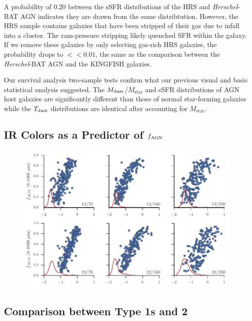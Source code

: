 \documentclass[fleqn, usenatbib]{mnras}
\newcommand{\herschel}{\emph{Herschel}}
\newcommand{\mstar}{$M_{\mathrm{star}}$}
\newcommand{\mdust}{$M_{\rm dust}$}
\newcommand{\tdust}{$T_{\rm dust}$}
\begin{document}
A probability of 0.20 between the sSFR distributions of the HRS and \herschel-BAT AGN indicates they are drawn from the same distribtution. However, the HRS sample contains galaxies that have been stripped of their gas due to infall into a cluster. The ram-pressure stripping likely quenched SFR within the galaxy. If we remove these galaxies by only selecting gas-rich HRS galaxies, the probability drops to $<<0.01$, the same as the comparison between the \herschel-BAT AGN and the KINGFISH galaxies.

Our survival analysis two-sample tests confirm what our previous visual and basic statistical analysis suggested. The \mdust/\mstar{} and sSFR distributions of AGN host galaxies are significantly different than those of normal star-forming galaxies while the \tdust{} distributions are identical after accounting for \mstar. 

\subsection{IR Colors as a Predictor of $f_{\rm AGN}$}

\begin{figure}
\includegraphics{figures/agnfrac_vs_flux_ratio}
\caption{\label{fig:agnfrac_vs_flux_ratio}}
\end{figure}

\subsection{Comparison between Type 1s and 2}
\end{document}
